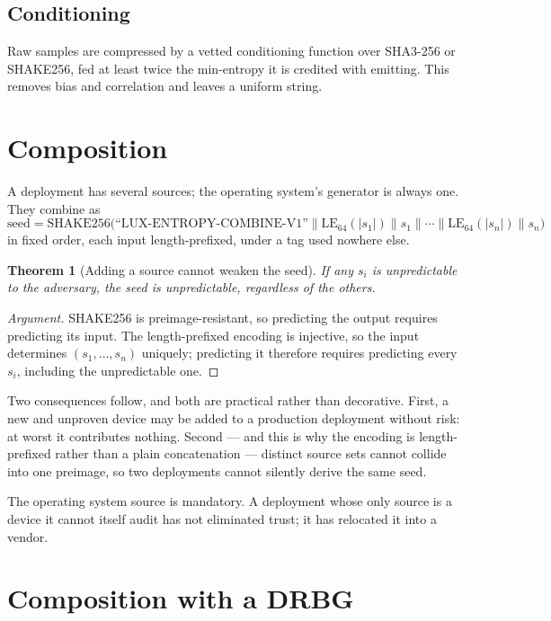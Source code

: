 \documentclass[11pt,a4paper]{article}
\newtheorem{theorem}{Theorem}[section]
\begin{document}
\subsection{Conditioning}

Raw samples are compressed by a vetted conditioning function over SHA3-256 or
SHAKE256, fed at least twice the min-entropy it is credited with emitting. This
removes bias and correlation and leaves a uniform string.

\section{Composition}

A deployment has several sources; the operating system's generator is always
one. They combine as
\[
\mathrm{seed} = \mathrm{SHAKE256}\bigl(\text{``LUX-ENTROPY-COMBINE-V1''}
\parallel \mathrm{LE}_{64}(|s_1|) \parallel s_1 \parallel \cdots \parallel
\mathrm{LE}_{64}(|s_n|) \parallel s_n\bigr)
\]
in fixed order, each input length-prefixed, under a tag used nowhere else.

\begin{theorem}[Adding a source cannot weaken the seed]
If any $s_i$ is unpredictable to the adversary, the seed is unpredictable,
regardless of the others.
\end{theorem}

\begin{proof}[Argument]
SHAKE256 is preimage-resistant, so predicting the output requires predicting
its input. The length-prefixed encoding is injective, so the input determines
$(s_1,\dots,s_n)$ uniquely; predicting it therefore requires predicting every
$s_i$, including the unpredictable one.
\end{proof}

Two consequences follow, and both are practical rather than decorative. First,
a new and unproven device may be added to a production deployment without risk:
at worst it contributes nothing. Second --- and this is why the encoding is
length-prefixed rather than a plain concatenation --- distinct source sets
cannot collide into one preimage, so two deployments cannot silently derive the
same seed.

The operating system source is mandatory. A deployment whose only source is a
device it cannot itself audit has not eliminated trust; it has relocated it
into a vendor.

\section{Composition with a DRBG}
\end{document}
